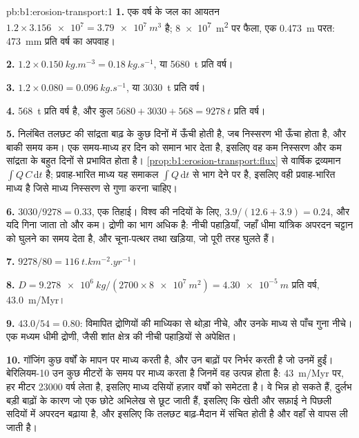 \begin{solution}{pb:b1:erosion-transport:1}
\textbf{1.} एक वर्ष के जल का आयतन $1.2 \times \num{3.156e7} = \qty{3.79e7}{m^3}$ है;
\qty{8e7}{m^2}
पर फैला, एक \qty{0.473}{m} परत: \qty{473}{mm} प्रति वर्ष का अपवाह।

\textbf{2.} $1.2 \times \qty{0.150}{kg.m^{-3}} = \qty{0.18}{kg.s^{-1}}$, या
\qty{5680}{t} प्रति वर्ष।

\textbf{3.} $1.2 \times 0.080 = \qty{0.096}{kg.s^{-1}}$, या \qty{3030}{t} प्रति
वर्ष।

\textbf{4.}  \qty{568}{t} प्रति वर्ष है, और कुल $5680 + 3030 +
568 = \qty{9278}{t}$ प्रति वर्ष।

\textbf{5.} निलंबित तलछट की सांद्रता बाढ़ के कुछ दिनों में ऊँची होती है, जब निस्सरण भी ऊँचा होता है, और बाकी समय कम। एक समय-माध्य हर दिन को समान भार देता है, इसलिए वह कम निस्सरण और कम सांद्रता के बहुत दिनों से प्रभावित होता है। \cref{prop:b1:erosion-transport:flux} से वार्षिक द्रव्यमान $\int Q\,C\,\mathrm dt$ है; प्रवाह-भारित माध्य यह समाकल $\int Q\,\mathrm dt$ से भाग देने पर है, इसलिए वही प्रवाह-भारित माध्य है जिसे माध्य निस्सरण से गुणा करना चाहिए।

\textbf{6.} $3030/9278 = \num{0.33}$, एक तिहाई। विश्व की नदियों के लिए,
$3.9/(12.6 + 3.9) = \num{0.24}$, और यदि  गिना जाता तो और कम। द्रोणी का भाग अधिक है: नीची पहाड़ियाँ, जहाँ धीमा यांत्रिक अपरदन चट्टान को घुलने का समय देता है, और चूना-पत्थर तथा खड़िया, जो पूरी तरह घुलते हैं।

\textbf{7.} $9278/80 = \qty{116}{t.km^{-2}.yr^{-1}}$।

\textbf{8.} $D = \qty{9.278e6}{kg}/(2700 \times \qty{8e7}{m^2}) =
\qty{4.30e-5}{m}$ प्रति वर्ष, \qty{43.0}{m/Myr}।

\textbf{9.} $43.0/54 = 0.80$: विमापित द्रोणियों की माध्यिका से थोड़ा नीचे, और उनके माध्य से पाँच गुना नीचे। एक मध्यम धीमी द्रोणी, जैसी शांत क्षेत्र की नीची पहाड़ियों से अपेक्षित।

\textbf{10.} गॉजिंग कुछ वर्षों के मापन पर माध्य करती है, और उन बाढ़ों पर निर्भर करती है जो उनमें हुईं। बेरिलियम-10 उन कुछ मीटरों के समय पर माध्य करता है जिनमें वह उत्पन्न होता है: \qty{43}{m/Myr} पर, हर मीटर \num{23000} वर्ष लेता है, इसलिए माध्य दसियों हज़ार वर्षों को समेटता है। वे भिन्न हो सकते हैं, दुर्लभ बड़ी बाढ़ों के कारण जो एक छोटे अभिलेख से छूट जाती हैं, इसलिए कि खेती और सफ़ाई ने पिछली सदियों में अपरदन बढ़ाया है, और इसलिए कि तलछट बाढ़-मैदान में संचित होती है और वहाँ से वापस ली जाती है।


\end{solution}
